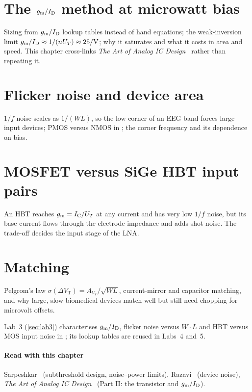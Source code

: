 \section{The \texorpdfstring{$g_\mathrm{m}/I_\mathrm{D}$}{gm/ID} method at microwatt bias}\label{sec:ch5-2}
Sizing from $g_\mathrm{m}/I_\mathrm{D}$ lookup tables instead of hand equations; the weak-inversion limit $g_\mathrm{m}/I_\mathrm{D} \approx 1/(nU_T) \approx \qty{25}{\per\volt}$; why it saturates and what it costs in area and speed. This chapter cross-links \emph{The Art of Analog IC Design}~\cite{artofaicd} rather than repeating it.

\section{Flicker noise and device area}\label{sec:ch5-3}
$1/f$ noise scales as $1/(WL)$, so the low corner of an EEG band forces large input devices; PMOS versus NMOS in \sgx{}; the corner frequency and its dependence on bias.

\section{MOSFET versus SiGe HBT input pairs}\label{sec:ch5-4}
An HBT reaches $g_\mathrm{m} = I_\mathrm{C}/U_T$ at any current and has very low $1/f$ noise, but its base current flows through the electrode impedance and adds shot noise. The trade-off decides the input stage of the \OB{} LNA.

\section{Matching}\label{sec:ch5-5}
Pelgrom's law $\sigma(\Delta V_\mathrm{T}) = A_{V_T}/\sqrt{WL}$, current-mirror and capacitor matching, and why large, slow biomedical devices match well but still need chopping for microvolt offsets.

\begin{tryit}
Lab~3 (\cref{sec:lab3}) characterises $g_\mathrm{m}/I_\mathrm{D}$, flicker noise versus $W\!\cdot\!L$ and HBT versus MOS input noise in \sgx{}; its lookup tables are reused in Labs~4 and~5.
\end{tryit}

\paragraph{Read with this chapter} Sarpeshkar~\cite{sarpeshkar} (subthreshold design, noise--power limits), Razavi~\cite{razavi} (device noise), \emph{The Art of Analog IC Design}~\cite{artofaicd} (Part II: the transistor and $g_\mathrm{m}/I_\mathrm{D}$).
